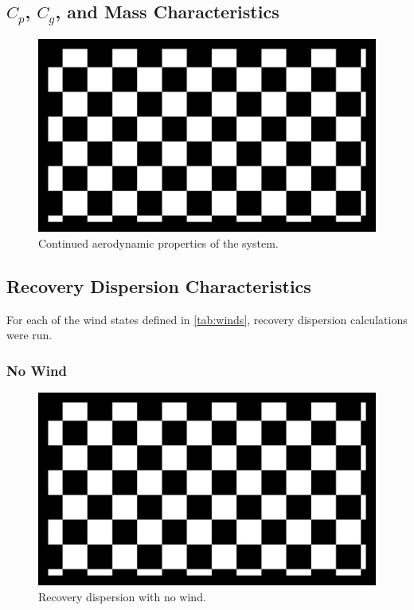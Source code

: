 \documentclass[12pt]{article}
\begin{document}
\subsection{$C_p$, $C_g$, and Mass Characteristics}
\begin{figure}
    \centering
    \includegraphics[width=.8\textwidth]{media/aero2.png}
    \caption{Continued aerodynamic properties of the system.}
\end{figure}
\subsection{Recovery Dispersion Characteristics}
For each of the wind states defined in \cref{tab:winds},
recovery dispersion calculations were run.
\subsubsection{No Wind}
\begin{figure}
    \centering
    \includegraphics[width=.8\textwidth]{media/nowind.png}
    \caption{Recovery dispersion with no wind.}
\end{figure}
\end{document}

